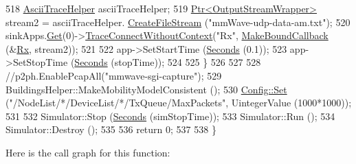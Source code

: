 \begin{DoxyCode}
518         \hyperlink{classns3_1_1AsciiTraceHelper}{AsciiTraceHelper} asciiTraceHelper;
519         \hyperlink{classns3_1_1Ptr}{Ptr<OutputStreamWrapper>} stream2 = asciiTraceHelper.
      \hyperlink{classns3_1_1AsciiTraceHelper_a44960bf2ca32835024eaedd26d1c4f94}{CreateFileStream} (\textcolor{stringliteral}{"mmWave-udp-data-am.txt"});
520         sinkApps.\hyperlink{classns3_1_1ApplicationContainer_a9e565807abd4213a56566a7ccd8d7509}{Get}(0)->\hyperlink{classns3_1_1ObjectBase_a1be45f6fd561e75dcac9dfa81b2b81e4}{TraceConnectWithoutContext}(\textcolor{stringliteral}{"Rx"},
      \hyperlink{group__makeboundcallback_ga1725d6362e6065faa0709f7c93f8d770}{MakeBoundCallback} (&\hyperlink{mmwave-tcp-building-example_8cc_a44926b91325d01c8749a8e4728a65087}{Rx}, stream2));
521 
522         app->SetStartTime (\hyperlink{group__timecivil_ga33c34b816f8ff6628e33d5c8e9713b9e}{Seconds} (0.1));
523         app->SetStopTime (\hyperlink{group__timecivil_ga33c34b816f8ff6628e33d5c8e9713b9e}{Seconds} (stopTime));
524 
525         \}
526 
527 
528         \textcolor{comment}{//p2ph.EnablePcapAll("mmwave-sgi-capture");}
529         BuildingsHelper::MakeMobilityModelConsistent ();
530         \hyperlink{group__config_gadce03667ec621d64ce4aace85d9bcfd0}{Config::Set} (\textcolor{stringliteral}{"/NodeList/*/DeviceList/*/TxQueue/MaxPackets"}, UintegerValue (1000*1000));
531 
532         Simulator::Stop (\hyperlink{group__timecivil_ga33c34b816f8ff6628e33d5c8e9713b9e}{Seconds} (simStopTime));
533         Simulator::Run ();
534         Simulator::Destroy ();
535 
536         \textcolor{keywordflow}{return} 0;
537 
538 \}
\end{DoxyCode}


Here is the call graph for this function\+:


